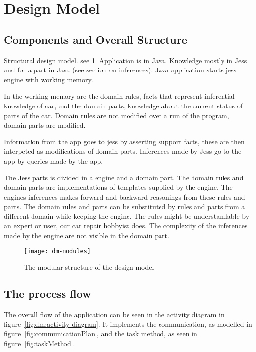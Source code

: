 \section{Design Model}


\subsection{Components and Overall Structure}
Structural design model.
see \ref{fig:dm:modules}. Application is in Java. Knowledge mostly in Jess and
for a part in Java (see section on inferences). Java application starts jess
engine with working memory.

In the working memory are the domain rules, facts
that represent inferential knowledge of car, and the domain parts, knowledge
about the current status of parts of the car. Domain rules are not modified over
a run of the program, domain parts are modified.

Information from the app goes to jess by asserting
support facts, these are then interpeted as modifications of domain parts.
Inferences made by Jess go to the app by queries made by the app.

The Jess parts is divided in a engine and a domain part. The domain rules and
domain parts are implementations of templates supplied by the engine. The
engines inferences makes forward and backward reasonings from these rules and
parts. The domain rules and parts can be substituted by rules and parts from a
different domain while keeping the engine. The rules might be understandable by an
expert or user, our car repair hobbyist does. The complexity of the inferences
made by the engine are not visible in the domain part.

\begin{figure}[htbp]
    \centering
    \texttt{[image: dm-modules]}
    \caption{The modular structure of the design model}
    \label{fig:dm:modules}
\end{figure}

\subsection{The process flow}
The overall flow of the application can be seen in the activity diagram in
figure~\ref{fig:dm:activity diagram}. It implements the communication, as
modelled in figure~\ref{fig:communicationPlan}, and the task method, as seen in
figure~\ref{fig:taskMethod}.

